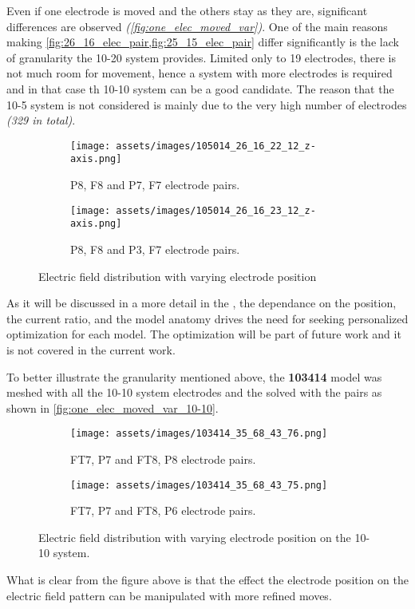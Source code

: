 Even if one electrode is moved and the others stay as they are, significant differences are observed \textit{(\autoref{fig:one_elec_moved_var})}. One of the main reasons making \cref{fig:26_16_elec_pair,fig:25_15_elec_pair} differ significantly is the lack of granularity the 10-20 system provides. Limited only to 19 electrodes, there is not much room for movement, hence a system with more electrodes is required and in that case th 10-10 system can be a good candidate. The reason that the 10-5 system is not considered is mainly due to the very high number of electrodes \textit{(329 in total)}.

\begin{figure}[H]
    \centering
    \begin{subfigure}[b]{0.49\textwidth}
        \texttt{[image: assets/images/105014\_26\_16\_22\_12\_z-axis.png]}
        \caption{P8, F8 and P7, F7 electrode pairs.}
        \label{fig:26_16_12_22_elec_pair}
    \end{subfigure}
    \begin{subfigure}[b]{0.49\textwidth}
        \texttt{[image: assets/images/105014\_26\_16\_23\_12\_z-axis.png]}
        \caption{P8, F8 and P3, F7 electrode pairs.}
        \label{fig:25_15_13_24_elec_pair}
    \end{subfigure}
    \caption{Electric field distribution with varying electrode position}
    \label{fig:one_elec_moved_var}
\end{figure}

As it will be discussed in a more detail in the , the dependance on the position, the current ratio, and the model anatomy drives the need for seeking personalized optimization for each model. The optimization will be part of future work and it is not covered in the current work.

To better illustrate the granularity mentioned above, the \textbf{103414} model was meshed with all the 10-10 system electrodes and the solved with the pairs as shown in \autoref{fig:one_elec_moved_var_10-10}.

\begin{figure}[H]
    \centering
    \begin{subfigure}[b]{0.49\textwidth}
        \texttt{[image: assets/images/103414\_35\_68\_43\_76.png]}
        \caption{FT7, P7 and FT8, P8 electrode pairs.}
        \label{fig:35_68_43_76_elec_pair}
    \end{subfigure}
    \begin{subfigure}[b]{0.49\textwidth}
        \texttt{[image: assets/images/103414\_35\_68\_43\_75.png]}
        \caption{FT7, P7 and FT8, P6 electrode pairs.}
        \label{fig:35_68_43_75_elec_pair}
    \end{subfigure}
    \caption{Electric field distribution with varying electrode position on the 10-10 system.}
    \label{fig:one_elec_moved_var_10-10}
\end{figure}

What is clear from the figure above is that the effect the electrode position on the electric field pattern can be manipulated with more refined moves.

